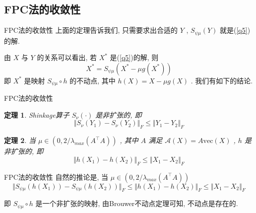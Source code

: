 \documentclass[slidestop, compress, mathserif, UTF8]{beamer}
\newtheorem{theo}{\bf \textcolor[rgb]{0.8,0,0}{定理}}[section]          %
\numberwithin{equation}{section}                                        %
\begin{document}
		\subsection{FPC法的收敛性}
			\begin{frame}[t]{FPC法的收敛性}
				上面的定理告诉我们, 只需要求出合适的 $Y$ , $S_{\psi \mu}(Y)$ 就是(\ref{q5})的解. 
				
				由 $X$ 与 $Y$ 的关系可以看出, 若 $X^*$ 是(\ref{q5})的解, 则
				\begin{equation}
						X^*
					=	S_{\psi \mu}(X^* - \mu g(X^*))
				\end{equation}
				即 $X^*$ 是映射 $S_{\psi \mu} \circ h$ 的不动点, 其中 $h(X) = X - \mu g(X)$ . 我们有如下的结论.
			\end{frame}
			\begin{frame}[t]{FPC法的收敛性}
				\begin{theo}
					Shinkage算子 $S_\nu(\cdot)$ 是非扩张的, 即
					\begin{equation}
						\Vert{S_\nu(Y_1) - S_\nu(Y_2)}\Vert_F \le \Vert{Y_1 - Y_2}\Vert_F
					\end{equation}
				\end{theo}

				\begin{theo}
					当 $\mu \in (0, 2/\lambda_{max}(A ^\top A))$ , 其中 $A$ 满足 $\mathcal{A}(X) = A \text{vec}(X)$ , $h$ 是非扩张的, 即
					\begin{equation}
						\Vert{h(X_1) - h(X_2)}\Vert_F \le \Vert{X_1 - X_2}\Vert_F
					\end{equation}
				\end{theo}
			\end{frame}
			\begin{frame}[t]{FPC法的收敛性}
				自然的推论是, 当 $\mu \in (0, 2/\lambda_{max}(A ^\top A))$
				\begin{equation}
					\Vert{S_{\psi \mu}(h(X_1)) - S_{\psi \mu}(h(X_2))}\Vert_F \le \Vert{h(X_1) - h(X_2)}\Vert_F \le \Vert{X_1 - X_2}\Vert_F
				\end{equation}

				即 $S_{\psi \mu} \circ h$ 是一个非扩张的映射, 由Brouwer不动点定理可知, 不动点是存在的.
			\end{frame}
\end{document}
